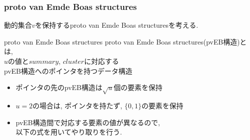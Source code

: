 \documentclass[dvipdfmx,12pt]{standalone}
\begin{document}
\begin{frame}\frametitle{proto van Emde Boas structures}
	動的集合$v$を保持するproto van Emde Boas structuresを考える.
	\begin{block}{proto van Emde Boas structures}
		proto van Emde Boas structures(pvEB構造)とは, \\
		$u$の値と$summary$, $cluster$に対応する\\ 
		pvEB構造へのポインタを持つデータ構造
		\begin{itemize}
			\item ポインタの先のpvEB構造は$\sqrt{u}$個の要素を保持\\
			\item $u = 2$の場合は, ポインタを持たず, $\{0, 1\}$の要素を保持\\
			\item pvEB構造間で対応する要素の値が異なるので, \\
				以下の式を用いてやり取りを行う.
		\end{itemize}
	\end{block}
\end{frame}
\end{document}
